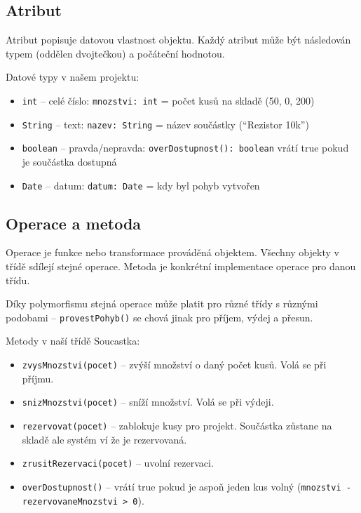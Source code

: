 \documentclass[12pt, a4paper]{article}
\begin{document}
\subsection{Atribut}

Atribut popisuje datovou vlastnost objektu. Každý atribut může být následován typem (oddělen dvojtečkou) a počáteční hodnotou.

Datové typy v našem projektu:
\begin{itemize}
  \item \texttt{int} -- celé číslo: \texttt{mnozstvi: int} = počet kusů na skladě (50, 0, 200)
  \item \texttt{String} -- text: \texttt{nazev: String} = název součástky (``Rezistor 10k'')
  \item \texttt{boolean} -- pravda/nepravda: \texttt{overDostupnost(): boolean} vrátí true pokud je součástka dostupná
  \item \texttt{Date} -- datum: \texttt{datum: Date} = kdy byl pohyb vytvořen
\end{itemize}

\subsection{Operace a metoda}

Operace je funkce nebo transformace prováděná objektem. Všechny objekty v třídě sdílejí stejné operace. Metoda je konkrétní implementace operace pro danou třídu.

Díky polymorfismu stejná operace může platit pro různé třídy s různými podobami -- \texttt{provestPohyb()} se chová jinak pro příjem, výdej a přesun.

Metody v naší třídě Soucastka:
\begin{itemize}
  \item \texttt{zvysMnozstvi(pocet)} -- zvýší množství o daný počet kusů. Volá se při příjmu.
  \item \texttt{snizMnozstvi(pocet)} -- sníží množství. Volá se při výdeji.
  \item \texttt{rezervovat(pocet)} -- zablokuje kusy pro projekt. Součástka zůstane na skladě ale systém ví že je rezervovaná.
  \item \texttt{zrusitRezervaci(pocet)} -- uvolní rezervaci.
  \item \texttt{overDostupnost()} -- vrátí true pokud je aspoň jeden kus volný (\texttt{mnozstvi - rezervovaneMnozstvi > 0}).
\end{itemize}
\end{document}
